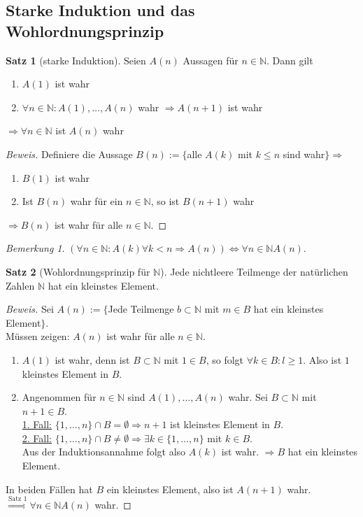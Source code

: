 \documentclass[12pt,a4paper,titlepage]{article} %
\theoremstyle{definition}
\newtheorem{satz}{Satz}[subsection]
\theoremstyle{remark}
\newtheorem*{bem}{Bemerkung}
\newenvironment{bew}{\begin{proof}[Beweis]}{\end{proof}}
\begin{document}
\subsection{Starke Induktion und das Wohlordnungsprinzip}
\begin{satz}[starke Induktion]
	Seien $A(n)$ Aussagen für $n\in\mathbb{N}$. Dann gilt
	\begin{enumerate}
		\item $A(1)$ ist wahr
		\item $\forall n\in\mathbb{N}: A(1), \ldots, A(n)$ wahr $\Rightarrow A(n+1)$ ist wahr
	\end{enumerate}
	$\Rightarrow \forall n\in\mathbb{N}$ ist $A(n)$ wahr
\end{satz}
\begin{bew}
	Definiere die Aussage $B(n) := \{$alle $A(k)$ mit $k\leq n$ sind wahr$\}\Rightarrow$
	\begin{enumerate}
		\item $B(1)$ ist wahr
		\item Ist $B(n)$ wahr für ein $n\in\mathbb{N}$, so ist $B(n+1)$ wahr
	\end{enumerate}
	$\Rightarrow B(n)$ ist wahr für alle $n\in\mathbb{N}$.
\end{bew}
\begin{bem}
	$(\forall n\in\mathbb{N}:A(k) \forall k<n \Rightarrow A(n)) \Leftrightarrow \forall n\in\mathbb{N} A(n)$.
\end{bem}
\begin{satz}[Wohlordnungsprinzip für $\mathbb{N}$]
	Jede nichtleere Teilmenge der natürlichen Zahlen $\mathbb{N}$ hat ein kleinstes Element.
\end{satz}
\begin{bew}
	Sei $A(n):= \{$Jede Teilmenge $b\subset\mathbb{N}$ mit $m\in B$ hat ein kleinstes Element$\}$.\\
	Müssen zeigen: $A(n)$ ist wahr für alle $n\in\mathbb{N}$.
	\begin{enumerate}
		\item $A(1)$ ist wahr, denn ist $B\subset \mathbb{N}$ mit $1\in B$, so folgt $\forall k \in B: l\geq 1$. Also ist $1$ kleinstes Element in $B$.
		\item Angenommen für $n\in\mathbb{N}$ sind $A(1),\ldots,A(n)$ wahr. Sei $B\subset \mathbb{N}$ mit $n+1\in B$.\\
		\underline{1. Fall:} $\{1,\ldots,n\}\cap B = \emptyset \Rightarrow n+1$ ist kleinstes Element in $B$.\\
		\underline{2. Fall:} $\{1,\ldots,n\} \cap B \neq \emptyset \Rightarrow \exists k\in \{1,\ldots,n\}$ mit $k\in B$.\\
		Aus der Induktionsannahme folgt also $A(k)$ ist wahr. $\Rightarrow B$ hat ein kleinstes Element.
	\end{enumerate}
	In beiden Fällen hat $B$ ein kleinstes Element, also ist $A(n+1)$ wahr.\\
	$\overset{\text{Satz 1}}{\Rightarrow} \forall n\in \mathbb{N} A(n)$ wahr.
\end{bew}
\end{document}
